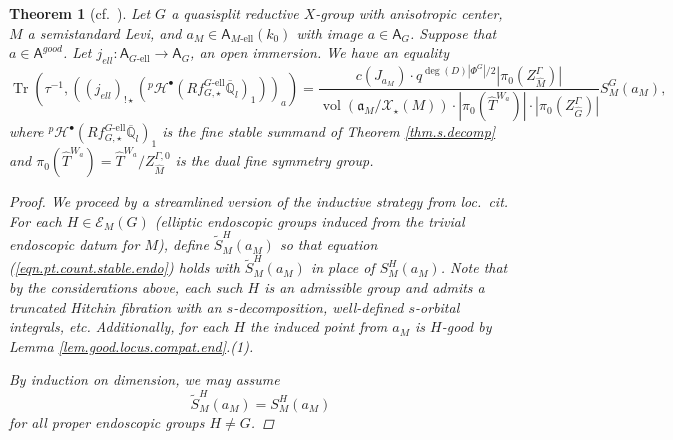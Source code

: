 \documentclass[openany]{amsbook}
\newtheorem{theorem}{Theorem}[chapter]
\theoremstyle{definition}
\theoremstyle{remark}
\numberwithin{equation}{section}
\newcommand{\Q}{\mathbb{Q}}
\newcommand{\cE}{\mathcal{E}}
\newcommand{\cX}{\mathcal{X}}
\newcommand{\ol}[1]{\overline{#1}}
\newcommand{\Tr}{\operatorname{Tr }}
\newcommand{\vol}{\operatorname{vol}}
\renewcommand{\-}{\operatorname{-}}
\renewcommand{\a}{\mathfrak{a}}
\newcommand{\pH}{{}^p \mathcal{H}}
\newcommand{\good}{\mathit{good}}
\newcommand{\wtilde}[1]{\widetilde{#1}}
\newcommand{\el}{\text{-ell}}
\newcommand{\bA}{\mathsf{A}}
\newcommand{\bAe}[1]{\bA_{#1\el}}
\begin{document}
\begin{theorem}[{cf.\ \cite[Th\'eor\`eme 14.1.1]{CLII}}]\label{thm.stable.point.count}
    Let $G$ a quasisplit reductive $X$-group with anisotropic center, $M$ a semistandard Levi, and $a_M \in \bAe{M}(k_0)$ with image $a \in \bA_G$. Suppose that $a \in \bA^{\good}$. Let $j_{ell} : \bAe{G} \to \bA_G$, an open immersion. We have an equality
    \begin{equation}\label{eqn.pt.count.stable.endo}
        \Tr(\tau^{-1}, ((j_{ell})_{!\star}(\pH^\bullet(Rf_{G,\star}^{G\el} \ol{\Q}_l)_1))_a) = \frac{c(J_{a_M}) \cdot q^{\deg(D) |\Phi^G|/2} |\pi_0(Z^\Gamma_{\widehat{M}})|}{\vol(\a_M/\cX_\star(M)) \cdot |\pi_0(\widehat{T}^{W_a})| \cdot |\pi_0(Z^\Gamma_{\widehat{G}})|} S_M^G(a_M),
    \end{equation}
    where $\pH^\bullet(Rf_{G,\star}^{G\el} \ol{\Q}_l)_1$ is the \emph{fine} stable summand of Theorem \ref{thm.s.decomp} and $\pi_0(\widehat{T}^{W_a}) = \widehat{T}^{W_a}/Z_{\widehat{M}}^{\Gamma,0}$ is the dual fine symmetry group.
\begin{proof} 
    We proceed by a streamlined version of the inductive strategy from \textit{loc.\ cit.} For each $H \in \cE_{M}(G)$ (elliptic endoscopic groups induced from the trivial endoscopic datum for $M$), define $\wtilde{S}_M^H(a_M)$ so that equation (\ref{eqn.pt.count.stable.endo}) holds with $\wtilde{S}_M^H(a_M)$ in place of $S_M^H(a_M)$. Note that by the considerations above, each such $H$ is an admissible group and admits a truncated Hitchin fibration with an $s$-decomposition, well-defined $s$-orbital integrals, etc. Additionally, for each $H$ the induced point from $a_M$ is $H$-good by Lemma \ref{lem.good.locus.compat.end}.(1).
    
    By induction on dimension, we may assume
    $$
        \wtilde{S}_M^H(a_M)={S}_M^H(a_M)
    $$
    for all proper endoscopic groups $H \neq G$. 


\end{proof}
\end{theorem}
\end{document}
